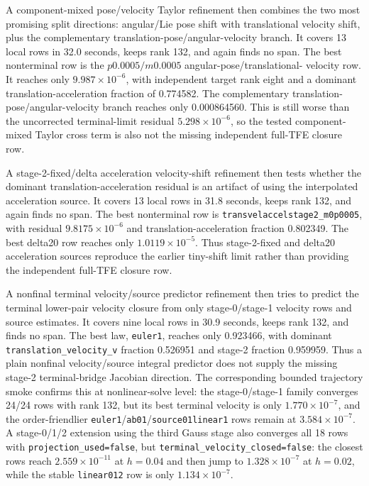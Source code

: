 \documentclass[11pt]{article}
\newcommand{\tfe}{TFE}
\begin{document}
A component-mixed pose/velocity Taylor refinement then combines the two most
promising split directions: angular/Lie pose shift with translational velocity
shift, plus the complementary translation-pose/angular-velocity branch.  It
covers 13 local rows in 32.0 seconds, keeps rank 132, and again finds no span.
The best nonterminal row is the $p0.0005/m0.0005$ angular-pose/translational-
velocity row.  It reaches only $9.987\times10^{-6}$, with independent target
rank eight and a dominant translation-acceleration fraction of 0.774582.  The
complementary translation-pose/angular-velocity branch reaches only
0.000864560.  This is still worse than the uncorrected terminal-limit residual
$5.298\times10^{-6}$, so the tested component-mixed Taylor cross term is also
not the missing independent full-\tfe{} closure row.

A stage-2-fixed/delta acceleration velocity-shift refinement then tests whether
the dominant translation-acceleration residual is an artifact of using the
interpolated acceleration source.  It covers 13 local rows in 31.8 seconds,
keeps rank 132, and again finds no span.  The best nonterminal row is
\texttt{transvelaccelstage2\_m0p0005}, with residual
$9.8175\times10^{-6}$ and translation-acceleration fraction 0.802349.  The best
delta20 row reaches only $1.0119\times10^{-5}$.  Thus stage-2-fixed and
delta20 acceleration sources reproduce the earlier tiny-shift limit rather
than providing the independent full-\tfe{} closure row.

A nonfinal terminal velocity/source predictor refinement then tries to predict
the terminal lower-pair velocity closure from only stage-0/stage-1 velocity rows
and source estimates.  It covers nine local rows in 30.9 seconds, keeps rank
132, and finds no span.  The best law, \texttt{euler1}, reaches only 0.923466,
with dominant \nolinkurl{translation_velocity_v} fraction 0.526951 and stage-2
fraction 0.959959.  Thus a plain nonfinal velocity/source integral predictor
does not supply the missing stage-2 terminal-bridge Jacobian direction.
The corresponding bounded trajectory smoke confirms this at nonlinear-solve
level: the stage-0/stage-1 family converges 24/24 rows with rank 132, but its
best terminal velocity is only $1.770\times10^{-7}$, and the order-friendlier
\texttt{euler1}/\texttt{ab01}/\texttt{source01linear1} rows remain at
$3.584\times10^{-7}$.  A stage-0/1/2 extension using the third Gauss stage also
converges all 18 rows with \nolinkurl{projection_used=false}, but
\nolinkurl{terminal_velocity_closed=false}: the closest rows reach
$2.559\times10^{-11}$ at $h=0.04$ and then jump to $1.328\times10^{-7}$ at
$h=0.02$, while the stable \texttt{linear012} row is only
$1.134\times10^{-7}$.
\end{document}
